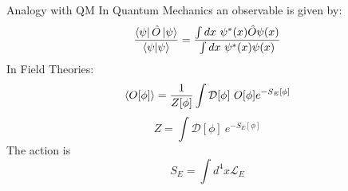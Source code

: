 \documentclass[10pt]{beamer}
\begin{document}
\begin{frame}{Analogy with QM}
	In Quantum Mechanics an observable is given by:
	\begin{equation}\nonumber
		\frac{\bra{\psi} \hat{O} \ket{\psi}   }{\braket{\psi|\psi}} = \frac{\int dx~\psi^*(x) \hat{O} \psi(x) }{\int dx~\psi^*(x) \psi(x)}
	\end{equation}
	In Field Theories:
	\begin{equation}\nonumber
		\braket{O[\phi]} = \frac{1}{Z[\phi]} \int  \mathcal{D}[\phi] ~O[\phi] e^{-S_E[\phi]}
	\end{equation}
	\begin{equation}\nonumber
		Z = \int \mathcal{D}[\phi] ~e^{-S_E[\phi]}
	\end{equation}
	The action is 
	\begin{equation}\nonumber
		S_E = \int d^4 x \mathcal{L}_E
	\end{equation}
\end{frame}
\end{document}
